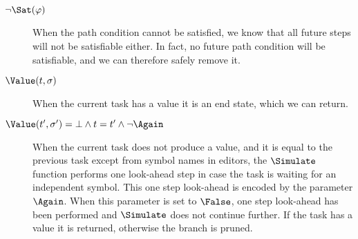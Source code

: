 \begin{description}
  \item[$\neg\Sat(\phi)$]
    When the path condition cannot be satisfied, we know that all future steps will not be satisfiable either.
    In fact, no future path condition will be satisfiable, and we can therefore safely remove it.

  \item[$\Value(t,\sigma)$]
    When the current task has a value it is an end state, which we can return.

  \item[$\Value(t',\sigma')=\bot\land t=t'\land \neg \Again$]
    When the current task does not produce a value, and it is equal to the previous task except from symbol names in editors, the $\Simulate$ function performs one look-ahead step in case the task is waiting for an independent symbol.
    This one step look-ahead is encoded by the parameter $\Again$.
    When this parameter is set to $\False$, one step look-ahead has been performed and $\Simulate$ does not continue further.
    If the task has a value it is returned, otherwise the branch is pruned.
\end{description}

